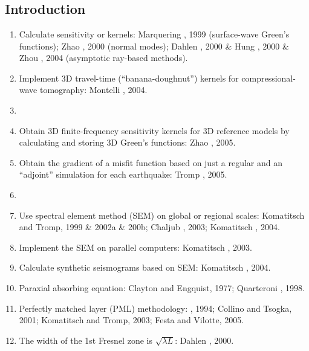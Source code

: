 \renewcommand{\pmk}{LiuQY\_2006\_BSSA\_Finite-frequency kernels}
\renewcommand{\prf}{FWI/\pmk.pdf}
\renewcommand{\pti}{Finite-frequency kernels based on adjoint methods}
\renewcommand{\pay}{Qinya Liu and Jeroen Tromp, 2006}
\renewcommand{\pjo}{Bulletin of the Seismological Society of America}
\renewcommand{\pda}{2016/12/23 Fri.}

\section{\pinfo}
\subsection{Introduction}
\begin{enumerate}[\hspace{10mm}*]
  \item Calculate sensitivity or \Frechet kernels:
    Marquering \etal, 1999 (surface-wave Green's functions);
    Zhao \etal, 2000 (normal modes);
    Dahlen \etal, 2000 \& Hung \etal, 2000 \& Zhou \etal, 2004 (asymptotic ray-based methods).
  \item Implement 3D travel-time (``banana-doughnut'') kernels for compressional-wave tomography:
    Montelli \etal, 2004.
  \item \sline
  \item Obtain 3D finite-frequency sensitivity kernels for 3D reference models
    by calculating and storing 3D Green's functions: Zhao \etal, 2005.
  \item Obtain the gradient of a misfit function based on
    just a regular and an ``adjoint'' simulation for each earthquake: Tromp \etal, 2005.
  \item \sline
  \item Use spectral element method (SEM) on global or regional scales:
    Komatitsch and Tromp, 1999 \& 2002a \& 200b; Chaljub \etal, 2003; Komatitsch \etal, 2004.
  \item Implement the SEM on parallel computers: Komatitsch \etal, 2003.
  \item Calculate synthetic seismograms based on SEM: Komatitsch \etal, 2004.
  \item Paraxial absorbing equation: Clayton and Engquist, 1977; Quarteroni \etal, 1998.
  \item Perfectly matched layer (PML) methodology: \Berenger, 1994; Collino and Tsogka, 2001;
    Komatitsch and Tromp, 2003; Festa and Vilotte, 2005.
  \item The width of the 1st Fresnel zone is $\sqrt{\lambda L}$: Dahlen \etal, 2000.

\end{enumerate}
